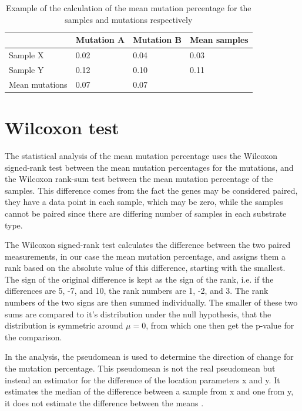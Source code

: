 \begin{table}[]
    \caption{Example of the calculation of the mean mutation percentage for the samples and mutations respectively}
    \label{example_mean_table}
\begin{tabular}{@{}lll|l@{}}
\toprule
               & Mutation A & Mutation B & Mean samples \\ \midrule
Sample X       & 0.02       & 0.04       & 0.03         \\
Sample Y       & 0.12       & 0.10       & 0.11         \\ \midrule
Mean mutations & 0.07       & 0.07       &              \\ 
\bottomrule 
\end{tabular}
\end{table}

\section{Wilcoxon test}
The statistical analysis of the mean mutation percentage uses the Wilcoxon signed-rank test between the mean mutation percentages for the mutations, and the Wilcoxon rank-sum test between the mean mutation percentage of the samples. 
This difference comes from the fact the genes may be considered paired, they have a data point in each sample, which may be zero, while the samples cannot be paired since there are differing number of samples in each substrate type.

The Wilcoxon signed-rank test calculates the difference between the two paired measurements, in our case the mean mutation percentage, and assigns them a rank based on the absolute value of this difference, starting with the smallest.
The sign of the original difference is kept as the sign of the rank, i.e. if the differences are 5, -7, and 10, the rank numbers are 1, -2, and 3. 
The rank numbers of the two signs are then summed individually. The smaller of these two sums are compared to it's distribution under the null hypothesis, that the distribution is symmetric around $\mu = 0$, from which one then get the p-value for the comparison\cite{wilcoxon1945IndividualComparisonsRanking}.

In the analysis, the pseudomean is used to determine the direction of change for the mutation percentage. This pseudomean is not the real pseudomean but instead an estimator for the difference of the location parameters x and y. It estimates the median of the difference between a sample from x and one from y, it does not estimate the difference between the means \cite{thercoreteamWilcoxtestWilcoxonRank}.

